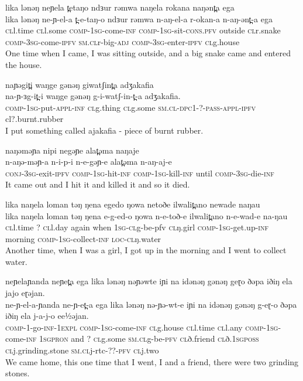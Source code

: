 \ex  lika lənəŋ neɲela t̪etaŋo ndɜur rəmwa naŋela rokana naŋənt̪a ega 	  \\ 
	\gll  lika lənəŋ ne-ɲ-el-a t̪-e-taŋ-o ndɜur rəmwa n-aŋ-el-a r-okan-a n-aŋ-ənt̪-a ega \\	
		  \textsc{cl}l.time \textsc{cl}l.some \textsc{comp-1sg}-come-\textsc{inf} \textsc{comp-1sg}-sit-\textsc{cons.pfv} outside \textsc{cl}r.snake \textsc{comp-3sg}-come-\textsc{ipfv} \textsc{sm.cl}r-big-\textsc{adj} \textsc{comp-3sg}-enter-\textsc{ipfv} \textsc{cl}g.house\\
		 \glt One time when I came, I was sitting outside, and a big snake came and entered the house.  
		 		 	  	  
\ex  naɲəgit̪i waŋge gənəŋ giwatʃint̪a adʒakafia 	  \\ 
	\gll  na-ɲ-ɜg-it̪-i waŋge gənəŋ g-i-watʃ-in-t̪-a adʒakafia. \\	
		  \textsc{comp-1sg}-put-\textsc{appl-inf} \textsc{cl}g.thing \textsc{cl}g.some \textsc{sm.cl-dpc1}-?-\textsc{pass-appl-ipfv} {cl}?.burnt.rubber  \\
		 \glt I put something called ajakafia - piece of burnt rubber.  
		 		 	  	  
\ex  naŋəməɲa nipi negəɲe alat̪əma naŋaje	  \\ 
	\gll  n-aŋə-məɲ-a n-i-p-i n-e-gəɲ-e alat̪əma n-aŋ-aj-e\\	
		  \textsc{conj-3sg}-exit-\textsc{ipfv} \textsc{comp-1sg}-hit-\textsc{inf} \textsc{comp-1sg}-kill-\textsc{inf} until \textsc{comp-3sg}-die-\textsc{inf}  \\
		 \glt It came out and I hit it and killed it and so it died.  
		 		 	  	  
\ex  lika naŋela loman təŋ ŋena egedo ŋowa netoðe ilwalit̪ano newade naŋau 	  \\ 
	\gll  lika naŋela loman təŋ ŋena e-g-ed-o ŋowa n-e-toð-e ilwalit̪ano n-e-wad-e na-ŋau \\	
		  \textsc{cl}l.time ? \textsc{cl}l.day again when \textsc{1sg-cl}g-be-{pfv} \textsc{cl}ŋ.girl   \textsc{comp-1sg}-get.up-\textsc{inf} morning \textsc{comp-1sg}-collect-\textsc{inf} \textsc{loc-cl}ŋ.water \\
		 \glt Another time, when I was a girl, I got up in the morning and I went to collect water.  
		 		 	  	  
\ex  neɲelaɲanda neɲet̪a ega lika lənəŋ nəɲəwte iɲi na idənəŋ gənəŋ geɽo ðəpa iðiŋ ela jajo eɽəjan. 	  \\ 
	\gll  ne-ɲ-el-a-ɲanda ne-ɲ-et̪-a ega lika lənəŋ nə-ɲə-wt-e iɲi na idənəŋ gənəŋ g-eɽ-o ðəpa iðiŋ ela j-a-j-o ee½əjan. \\	
		  \textsc{comp-1}-go-\textsc{inf-1expl} \textsc{comp-1sg}-come-\textsc{inf} \textsc{cl}g.house \textsc{cl}l.time \textsc{cl}l.any \textsc{comp-1sg}-come-\textsc{inf} \textsc{1sgpron} and ? \textsc{cl}g.some \textsc{sm.cl}g-be-\textsc{pfv} \textsc{cl}ð.friend \textsc{cl}ð.\textsc{1sgposs} \textsc{cl}j.grinding.stone \textsc{sm.cl}j-rtc-??-\textsc{pfv} \textsc{cl}j.two  \\
		 \glt We came home, this one time that I went, I and a friend, there were two grinding stones.  
		 		 	  	  

